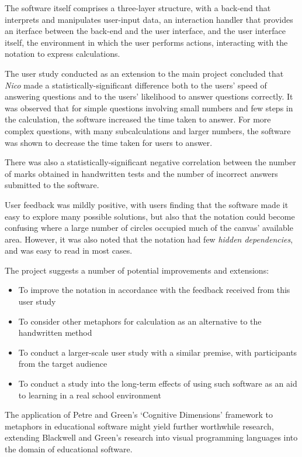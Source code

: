 \documentclass[12pt,twoside,notitlepage,xetex]{report}
\begin{document}
The software itself comprises a three-layer structure, with a back-end that interprets and manipulates user-input data, an interaction handler that provides an iterface between the back-end and the user interface, and the user interface itself, the environment in which the user performs actions, interacting with the notation to express calculations.

The user study conducted as an extension to the main project concluded that \emph{Nico} made a statistically-significant difference both to the users' speed of answering questions and to the users' likelihood to answer questions correctly.  It was observed that for simple questions involving small numbers and few steps in the calculation, the software increased the time taken to answer.  For more complex questions, with many subcalculations and larger numbers, the software was shown to decrease the time taken for users to answer.

There was also a statistically-significant negative correlation between the number of marks obtained in handwritten tests and the number of incorrect answers submitted to the software.

User feedback was mildly positive, with users finding that the software made it easy to explore many possible solutions, but also that the notation could become confusing where a large number of circles occupied much of the canvas' available area.  However, it was also noted that the notation had few \emph{hidden dependencies}, and was easy to read in most cases.

The project suggests a number of potential improvements and extensions:
\begin{itemize}
\item To improve the notation in accordance with the feedback received from this user study
\item To consider other metaphors for calculation as an alternative to the handwritten method
\item To conduct a larger-scale user study with a similar premise, with participants from the target audience
\item To conduct a study into the long-term effects of using such software as an aid to learning in a real school environment
\end{itemize}

The application of Petre and Green's `Cognitive Dimensions' framework to metaphors in educational software might yield further worthwhile research, extending Blackwell and Green's research into visual programming languages into the domain of educational software. \cite{Green1996} \cite{Blackwell1999}
\end{document}
